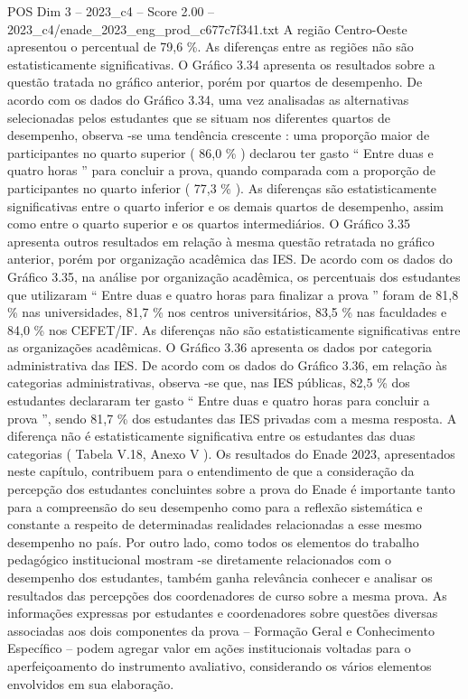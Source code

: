 \begin{textsample}{POS Dim 3 – 2023\_c4 – Score 2.00 – 2023\_c4/enade\_2023\_eng\_prod\_c677c7f341.txt}
A região Centro-Oeste apresentou o percentual de 79,6 \%.
As diferenças entre as regiões não são estatisticamente significativas.
O Gráfico 3.34 apresenta os resultados sobre a questão tratada no gráfico anterior, porém por quartos de desempenho.
De acordo com os dados do Gráfico 3.34, uma vez analisadas as alternativas selecionadas pelos estudantes que se situam nos diferentes quartos de desempenho, observa -se uma tendência crescente : uma proporção maior de participantes no quarto superior ( 86,0 \% ) declarou ter gasto “ Entre duas e quatro horas ” para concluir a prova, quando comparada com a proporção de participantes no quarto inferior ( 77,3 \% ).
As diferenças são estatisticamente significativas entre o quarto inferior e os demais quartos de desempenho, assim como entre o quarto superior e os quartos intermediários.
O Gráfico 3.35 apresenta outros resultados em relação à mesma questão retratada no gráfico anterior, porém por organização acadêmica das IES.
De acordo com os dados do Gráfico 3.35, na análise por organização acadêmica, os percentuais dos estudantes que utilizaram “ Entre duas e quatro horas para finalizar a prova ” foram de 81,8 \% nas universidades, 81,7 \% nos centros universitários, 83,5 \% nas faculdades e 84,0 \% nos CEFET/IF.
As diferenças não são estatisticamente significativas entre as organizações acadêmicas.
O Gráfico 3.36 apresenta os dados por categoria administrativa das IES.
De acordo com os dados do Gráfico 3.36, em relação às categorias administrativas, observa -se que, nas IES públicas, 82,5 \% dos estudantes declararam ter gasto “ Entre duas e quatro horas para concluir a prova ”, sendo 81,7 \% dos estudantes das IES privadas com a mesma resposta.
A diferença não é estatisticamente significativa entre os estudantes das duas categorias ( Tabela V.18, Anexo V ).
Os resultados do Enade 2023, apresentados neste capítulo, contribuem para o entendimento de que a consideração da percepção dos estudantes concluintes sobre a prova do Enade é importante tanto para a compreensão do seu desempenho como para a reflexão sistemática e constante a respeito de determinadas realidades relacionadas a esse mesmo desempenho no país.
Por outro lado, como todos os elementos do trabalho pedagógico institucional mostram -se diretamente relacionados com o desempenho dos estudantes, também ganha relevância conhecer e analisar os resultados das percepções dos coordenadores de curso sobre a mesma prova.
As informações expressas por estudantes e coordenadores sobre questões diversas associadas aos dois componentes da prova – Formação Geral e Conhecimento Específico – podem agregar valor em ações institucionais voltadas para o aperfeiçoamento do instrumento avaliativo, considerando os vários elementos envolvidos em sua elaboração.

\end{textsample}
